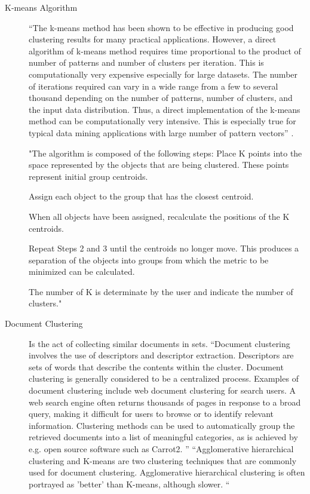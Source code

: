 \documentclass[fleqn,10pt]{SelfArx} %
\begin{document}
\begin{description}
	\item[K-means Algorithm] “The k-means method has been shown to be effective in producing good clustering results for many practical applications. However, a direct algorithm of k-means method requires time proportional to the product of number of patterns and number of clusters per iteration. This is computationally very expensive especially for large datasets.
	The number of iterations required can vary in a wide range from a few to several thousand depending on the number of patterns, number of clusters, and the input data distribution. Thus, a direct implementation of the k-means method can be computationally very intensive. This is especially true for typical data mining applications with large number of pattern vectors” \cite{K-means}. 
	
	"The algorithm is composed of the following steps:
	Place K points into the space represented by the objects that are being clustered. These points represent initial group centroids.
	
	Assign each object to the group that has the closest centroid.
	
	When all objects have been assigned, recalculate the positions of the K centroids.
	
	Repeat Steps 2 and 3 until the centroids no longer move. This produces a separation of the objects into groups from which the metric to be minimized can be calculated.
	
	The number of K is determinate by the user and indicate the number of clusters."
	\cite{K-means Algorithm}
	
	\item[Document Clustering] Is the act of collecting similar documents in sets. “Document clustering involves the use of descriptors and descriptor extraction. Descriptors are sets of words that describe the contents within the cluster. Document clustering is generally considered to be a centralized process. Examples of document clustering include web document clustering for search users.
	A web search engine often returns thousands of pages in response to a broad query, making it difficult for users to browse or to identify relevant information. Clustering methods can be used to automatically group the retrieved documents into a list of meaningful categories, as is achieved by e.g. open source software such as Carrot2.
	” \cite{document clustering}
	“Agglomerative hierarchical clustering and K-means are two clustering techniques that are commonly used for document clustering. Agglomerative hierarchical clustering is often portrayed as 'better' than K-means, although slower. “ \cite{Doc_clust_techniques}
	

\end{description}
\end{document}
